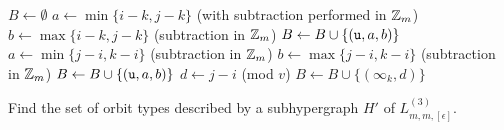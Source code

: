 \begin{algorithm}
$B \gets \emptyset$\;
 {
     {
        $a \gets \min\{ i-k, j-k \}$ (with subtraction performed in $\mathbb{Z}_m$)\;
        $b \gets \max\{ i-k, j-k \}$ (subtraction in $\mathbb{Z}_m$)\;
        $B \gets B \cup \{ ({\tt u}, a, b) \}$ \;
    }  {
        $a \gets \min\{ j-i, k-i \}$ (subtraction in $\mathbb{Z}_m$)\;
        $b \gets \max\{ j-i, k-i \}$ (subtraction in $\mathbb{Z}_m$)\;
        $B \gets B \cup \{ ({\tt u}, a, b) \}$ \;
    }  {
        $d \gets j-i$ (mod $v$)\;
        $B \gets B \cup \{ (\infty_k, d) \}$ \;
    }
}
\;
\caption{Find the set of orbit types described by a subhypergraph $H'$ of $L_{m,m,[\epsilon]}^{(3)}$.} \label{alg:candelabra-hypergraph-type}
\end{algorithm}

\newpage
